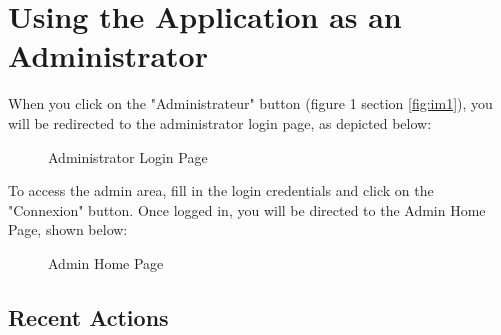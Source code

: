 \documentclass[12pt]{article}
\begin{document}
\section{Using the Application as an Administrator}

When you click on the "Administrateur" button (figure 1 section \textcolor{blue}{\ref{fig:im1}}), you will be redirected to the administrator login page, as depicted below:

\begin{figure}[H]
    \centering
    \caption{Administrator Login Page}
\end{figure}

To access the admin area, fill in the login credentials and click on the "Connexion" button. Once logged in, you will be directed to the Admin Home Page, shown below:

\begin{figure}[H]
    \centering
    \caption{Admin Home Page}
\end{figure}

\subsection{Recent Actions}
\end{document}

